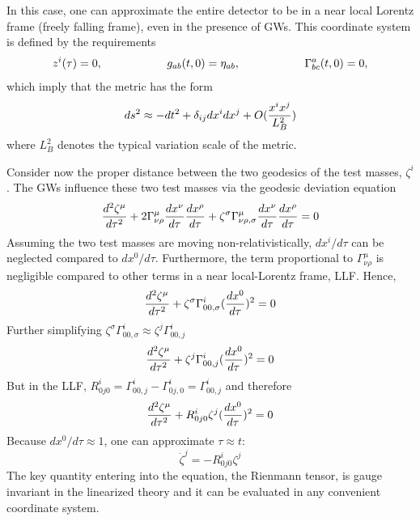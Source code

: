\documentclass[binding=0.6cm, LaM]{sapthesis}
\begin{document}
        In this case, one can approximate the entire detector to be in a near local Lorentz frame
        (freely falling frame), even in the presence of GWs. This coordinate system is defined by the requirements
        \begin{equation}
          z^i(\tau) = 0, \hspace*{2cm} g_{ab}(t, 0) = \eta_{ab}, \hspace*{2cm} \Gamma^a_{bc}(t,0) = 0,
        \end{equation}
        which imply that the metric has the form
        \begin{equation}
          ds^2 \approx -dt^2 + \delta_{ij}dx^i dx^j + O({{x^ix^j}\over{L^2_B}})
        \end{equation}
        where $L^2_B$ denotes the typical variation scale of the metric.

        Consider now the proper distance between the two geodesics of the test masses, $\zeta^i$.
        The GWs influence these two test masses via the geodesic deviation equation
        \begin{equation}
          {{d^2\zeta^{\mu}}\over{d\tau^2}} + 2\Gamma^{\mu}_{\nu\rho}{{dx^{\nu}}\over{d\tau}}{{dx^\rho}\over{d\tau}} + \zeta^{\sigma}\Gamma^{\mu}_{\nu\rho,\sigma}{{dx^{\nu}}\over{d\tau}}{{dx^{\rho}}\over{d\tau}} = 0
        \end{equation}
        Assuming the two test masses are moving non-relativistically, $dx^i/d\tau$ can be neglected compared to $dx^0/d\tau$.
        Furthermore, the term proportional to $\Gamma^{\mu}_{\nu\rho}$ is negligible compared to other terms in a near local-Lorentz frame, LLF. Hence,
        \begin{equation}
          {{d^2\zeta^{\mu}}\over{d\tau^2}} + \zeta^{\sigma}\Gamma^{i}_{00, \sigma}({{dx^0}\over{d\tau}})^2 = 0
        \end{equation}
        Further simplifying $\zeta^{\sigma}\Gamma^{i}_{00, \sigma} \approx \zeta^{j}\Gamma^{i}_{00, j}$
        \begin{equation}
          {{d^2\zeta^{\mu}}\over{d\tau^2}} + \zeta^{j}\Gamma^{i}_{00,j}({{dx^0}\over{d\tau}})^2 = 0
        \end{equation}
        But in the LLF, $R^i_{0j0} = \Gamma^i_{00,j} - \Gamma^i_{0j,0} = \Gamma^i_{00,j}$ and therefore
        \begin{equation}
          {{d^2\zeta^{\mu}}\over{d\tau^2}} + R^i_{0j0} \zeta^j({{dx^0}\over{d\tau}})^2 = 0
        \end{equation}
        Because $dx^0/d\tau \approx 1$, one can approximate $\tau \approx t$:
        \begin{equation}
          {\ddot \zeta}^j = - R^i_{0j0}\zeta^j
        \end{equation}
        The key quantity entering into the equation, the Rienmann tensor, is gauge invariant in the linearized theory and
        it can be evaluated in any convenient coordinate system.
\end{document}
